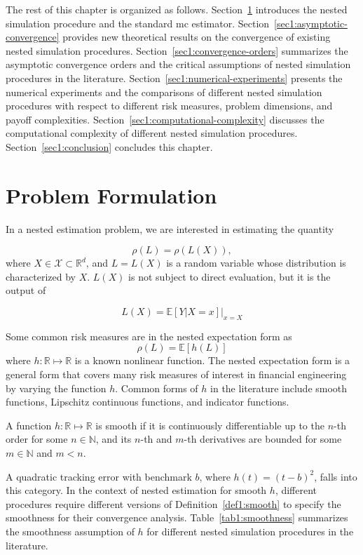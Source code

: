 The rest of this chapter is organized as follows.
Section~\ref{sec1:problem-formulation} introduces the nested simulation procedure and the standard \gls{mc} estimator.
Section~\ref{sec1:asymptotic-convergence} provides new theoretical results on the convergence of existing nested simulation procedures.
Section~\ref{sec1:convergence-orders} summarizes the asymptotic convergence orders and the critical assumptions of nested simulation procedures in the literature.
Section~\ref{sec1:numerical-experiments} presents the numerical experiments and the comparisons of different nested simulation procedures with respect to different risk measures, problem dimensions, and payoff complexities.
Section~\ref{sec1:computational-complexity} discusses the computational complexity of different nested simulation procedures.
Section~\ref{sec1:conclusion} concludes this chapter.

\section{Problem Formulation}\label{sec1:problem-formulation}

In a nested estimation problem, we are interested in estimating the quantity 

$$\rho(L) = \rho(L(X)),$$
where $X \in \mathcal{X} \subset \mathbb{R}^d$, and $L = L(X)$ is a random variable whose distribution is characterized by $X$.
$L(X)$ is not subject to direct evaluation, but it is the output of 

$$ L(X) = \mathbb{E}\left[ Y|X=x \right]\vert_{x=X} $$

Some common risk measures are in the nested expectation form as
$$\rho(L) = \mathbb{E}\left[ h(L) \right]$$
where $h: \mathbb{R} \mapsto \mathbb{R}$ is a known nonlinear function. 
The nested expectation form is a general form that covers many risk measures of interest in financial engineering by varying the function $h$.
Common forms of $h$ in the literature include smooth functions, Lipschitz continuous functions, and indicator functions.

\begin{definition}\label{def1:smooth}
    A function $h: \mathbb{R} \mapsto \mathbb{R}$ is smooth if it is continuously differentiable up to the $n$-th order for some $n \in \mathbb{N}$, 
    and its $n$-th and $m$-th derivatives are bounded for some $m \in \mathbb{N}$ and $m < n$.
\end{definition}

A quadratic tracking error with benchmark $b$, where $h(t) = (t - b)^2$, falls into this category.
In the context of nested estimation for smooth $h$, different procedures require different versions of Definition~\ref{def1:smooth} to specify the smoothness for their convergence analysis.
Table~\ref{tab1:smoothness} summarizes the smoothness assumption of $h$ for different nested simulation procedures in the literature.

